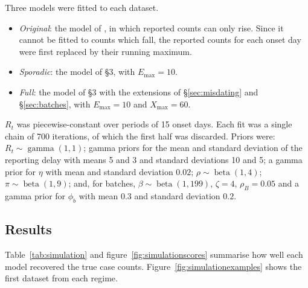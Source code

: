 \documentclass[11pt,a4paper]{article}
\newcommand{\Emax}{E_{\max}}
\newcommand{\Xmax}{X_{\max}}
\begin{document}
Three models were fitted to each dataset.
\begin{itemize}[itemsep=2pt]
\item \emph{Original}: the model of \cite{bajaj2025}, in which reported counts
can only rise. Since it cannot be fitted to counts which fall, the reported
counts for each onset day were first replaced by their running maximum.
\item \emph{Sporadic}: the model of \S3, with $\Emax=10$.
\item \emph{Full}: the model of \S3 with the extensions of
\S\ref{sec:misdating} and \S\ref{sec:batches}, with $\Emax=10$ and $\Xmax=60$.
\end{itemize}
$R_t$ was piecewise-constant over periods of 15 onset days. Each fit was a
single chain of 700 iterations, of which the first half was discarded. Priors
were: $R_t\sim\operatorname{gamma}(1,1)$; gamma priors for the mean and
standard deviation of the reporting delay with means 5 and 3 and standard
deviations 10 and 5; a gamma prior for $\eta$ with mean and standard deviation
$0.02$; $\rho\sim\operatorname{beta}(1,4)$; $\pi\sim\operatorname{beta}(1,9)$;
and, for batches, $\beta\sim\operatorname{beta}(1,199)$, $\zeta=4$,
$\rho_B=0.05$ and a gamma prior for $\phi_b$ with mean $0.3$ and standard
deviation $0.2$.

\subsection{Results}

Table~\ref{tab:simulation} and figure~\ref{fig:simulationscores} summarise how
well each model recovered the true case counts. Figure~\ref{fig:simulationexamples}
shows the first dataset from each regime.
\end{document}
